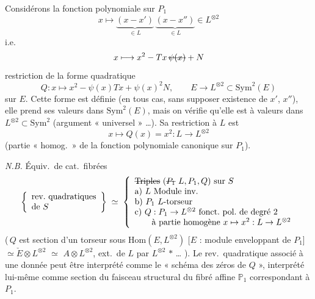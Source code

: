 \documentclass[11pt,a4paper]{article}
\begin{document}
Considérons la fonction polynomiale sur $P_{1}$
\[
  x \longmapsto \underbrace{(x - x')}_{\in L}\,\underbrace{(x - x'')}_{\in L} \in L^{\otimes 2}
\]
i.e.
\[
  x \longmapsto x^{2} - Tx\,\text{\struck{$\psi(x)$}} + N
\]
restriction de la forme quadratique
\[
  Q : x \longmapsto x^{2} - \psi(x)Tx + \psi(x)^{2}N, \qquad E \to L^{\otimes 2} \subset \mathrm{Sym}^{2}(E)
\]
sur $E$. Cette forme est définie  (en tous cas, sans supposer existence de $x'$, $x''$), elle prend ses valeurs dans $\mathrm{Sym}^{2}(E)$, mais  on vérifie qu'elle est à valeurs dans $L^{\otimes 2} \subset \mathrm{Sym}^{2}$ (argument « universel » …). Sa restriction à $L$ est
\[
  x \longmapsto Q(x) = x^{2} : L \to L^{\otimes 2}
\]
(partie « homog.\ » de la fonction polynomiale  canonique sur $P_{1}$).

\emph{N.B.} Équiv.\ de cat.\ fibrées
\[
  \left\{\begin{array}{l}\text{rev.\ quadratiques}\\ \text{de } S\end{array}\right\}
  \;\simeq\;
  \left\{\begin{array}{l}
    \text{\struck{Triples} $(\text{\struck{$P_{1}$}}\ L, P_{1}, Q)$ sur $S$}\\
    \text{a) $L$ Module inv.}\\
    \text{b) $P_{1}$ $L$-torseur}\\
    \text{c) $Q : P_{1} \to L^{\otimes 2}$ fonct.\ pol.\ de degré 2}\\
    \qquad\text{à partie homogène $x \mapsto x^{2} : L \to L^{\otimes 2}$}
  \end{array}\right.
\]
(\,$Q$ est section d'un torseur sous  $\mathrm{Hom}(E, L^{\otimes 2})$ [$E$ : module enveloppant de $P_{1}$] $\simeq \check{E} \otimes L^{\otimes 2}$ $\simeq$ \ill{} $A \otimes L^{\otimes 2}$, ext.\ de $L$ par $L^{\otimes 2}$ $\ast$ … ). Le rev.\ quadratique associé à une donnée peut être interprété comme le « schéma des zéros de $Q$ », interprété lui-même comme section du faisceau structural du fibré affine $\mathbb{P}_{1}$ correspondant à $P_{1}$.

\end{document}
